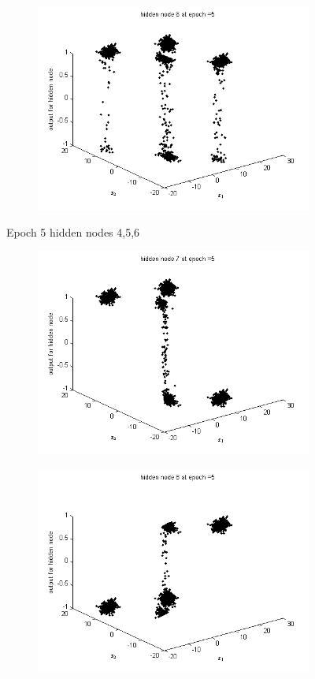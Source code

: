 \documentclass{article}
\begin{document}
\begin{flushleft}
\begin{figure}
\begin{subfigure}{.3\textwidth}
\end{subfigure}
\begin{subfigure}{.3\textwidth}
  \centering
  \includegraphics[width=.8\linewidth]{Classification/linearlySeparable/h5_6}
  
\end{subfigure}
\caption{Epoch 5 hidden nodes 4,5,6}
\end{figure}

\begin{figure}
\begin{subfigure}{.3\textwidth}
  \centering
  \includegraphics[width=.8\linewidth]{Classification/linearlySeparable/h5_7}
 
\end{subfigure}%
\begin{subfigure}{.3\textwidth}
  \centering
  \includegraphics[width=.8\linewidth]{Classification/linearlySeparable/h5_8}
  

\end{subfigure}
\end{figure}
\end{flushleft}
\end{document}
